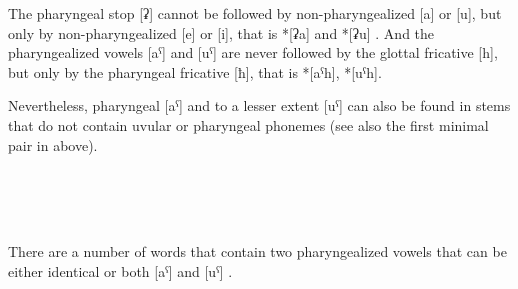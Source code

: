 The pharyngeal stop [ʡ] cannot be followed by non-pharyngealized [a] or [u], but only by non-pharyngealized [e] or [i], that is *[ʡa] and *[ʡu] . And the pharyngealized vowels [aˁ] and [uˁ] are never followed by the glottal fricative [h], but only by the pharyngeal fricative [ħ], that is *[aˁh], *[uˁh].

Nevertheless, pharyngeal [aˁ] and to a lesser extent [uˁ] can also be found in stems that do not contain uvular or pharyngeal phonemes  (see also the first minimal pair in  above).
%
\begin{exe}
	\ex	\label{ex:not uvular phon}
\TabPositions{12em}
		 	\tab 		{} 	\\
		 	\tab 		{} 	\\
		 	\tab 		{} 	\\
		 	\tab 		{} 	

\end{exe}

There are a number of words that contain two pharyngealized vowels that can be either identical or both [aˁ] and [uˁ] .
%
\begin{exe}
	\ex	\label{ex:two pharyngealized vowels phon}
\TabPositions{12em}
		 	\tab 	{} 	\\
		 		\tab 	{} 	\\
		 	\tab 	{}  \\	
		 		\tab 	{} 			\\
		 		\tab 	{} 	
\end{exe}

